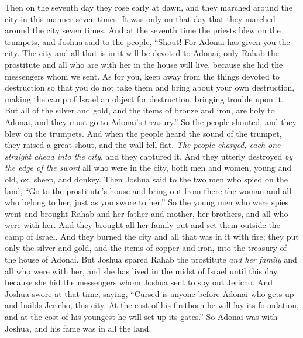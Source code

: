 \begin{biblechapter}
\verse Then on the seventh day they rose early at dawn, and they marched around the city in this manner seven times. It was only on that day that they marched around the city seven times.
\verse And at the seventh time the priests blew on the trumpets, and Joshua said to the people, “Shout! For Adonai has given you the city.
\verse The city and all that is in it will be devoted to Adonai; only Rahab the prostitute and all who are with her in the house will live, because she hid the messengers whom we sent.
\verse As for you, keep away from the things devoted to destruction so that you do not take them and bring about your own destruction, making the camp of Israel an object for destruction, bringing trouble upon it.
\verse But all of the silver and gold, and the items of bronze and iron, are holy to Adonai, and they must go to Adonai’s treasury.”
\verse So the people shouted, and they blew on the trumpets. And when the people heard the sound of the trumpet, they raised a great shout, and the wall fell flat. \textit{The people charged, each one straight ahead into the city}, and they captured it.
\verse And they utterly destroyed \textit{by the edge of the sword} all who were in the city, both men and women, young and old, ox, sheep, and donkey.
\verse Then Joshua said to the two men who spied on the land, “Go to the prostitute’s house and bring out from there the woman and all who belong to her, just as you swore to her.”
\verse So the young men who were spies went and brought Rahab and her father and mother, her brothers, and all who were with her. And they brought all her family out and set them outside the camp of Israel.
\verse And they burned the city and all that was in it with fire; they put only the silver and gold, and the items of copper and iron, into the treasury of the house of Adonai.
\verse But Joshua spared Rahab the prostitute \textit{and her family} and all who were with her, and she has lived in the midst of Israel until this day, because she hid the messengers whom Joshua sent to spy out Jericho.
\verse And Joshua swore at that time, saying, “Cursed is anyone before Adonai who gets up and builds Jericho, this city. At the cost of his firstborn he will lay its foundation, and at the cost of his youngest he will set up its gates.”
\verse So Adonai was with Joshua, and his fame was in all the land.
\end{biblechapter}

